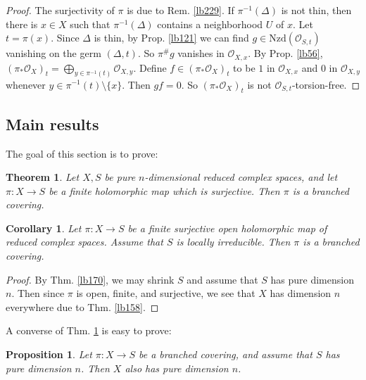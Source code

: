 \documentclass[12pt,b5paper,notitlepage]{report}
\theoremstyle{definition}
\theoremstyle{plain}
\newtheorem{thm}[df]{Theorem}
\newtheorem{pp}[df]{Proposition}
\newtheorem{co}[df]{Corollary}
\newcommand{\scr}{\mathscr}
\newcommand{\Nzd}{\mathrm{Nzd}}
\numberwithin{equation}{section}
\begin{document}
\begin{proof}
The surjectivity of $\pi$ is due to Rem. \ref{lb229}. If $\pi^{-1}(\Delta)$ is not thin, then there is $x\in X$ such that $\pi^{-1}(\Delta)$ contains a neighborhood $U$ of $x$. Let $t=\pi(x)$. Since $\Delta$ is thin, by Prop. \ref{lb121} we can find $g\in\Nzd(\scr O_{S,t})$ vanishing on the germ $(\Delta,t)$. So $\pi^\#g$ vanishes in $\scr O_{X,x}$. By Prop. \ref{lb56}, $(\pi_*\scr O_X)_t=\bigoplus_{y\in\pi^{-1}(t)}\scr O_{X,y}$. Define $f\in (\pi_*\scr O_X)_t$ to be $1$ in $\scr O_{X,x}$ and $0$ in $\scr O_{X,y}$ whenever $y\in\pi^{-1}(t)\setminus\{x\}$. Then $gf=0$. So $(\pi_*\scr O_X)_t$ is not $\scr O_{S,t}$-torsion-free.
\end{proof}



\subsection{Main results}


The goal of this section is to prove:


\begin{thm}\label{lb198}
Let $X,S$ be pure $n$-dimensional reduced complex spaces, and let $\pi:X\rightarrow S$ be a finite holomorphic map which is surjective. Then $\pi$ is a branched covering.
\end{thm}



\begin{co}\label{lb233}
Let $\pi:X\rightarrow S$ be a finite surjective open holomorphic map of reduced complex spaces. Assume that $S$ is locally irreducible. Then $\pi$ is a branched covering.
\end{co}


\begin{proof}
By Thm. \ref{lb170}, we may shrink $S$ and assume that $S$ has pure dimension $n$. Then since $\pi$ is open, finite, and surjective, we see that $X$ has dimension $n$ everywhere due to Thm. \ref{lb158}.
\end{proof}





A converse of Thm. \ref{lb198} is easy to prove:

\begin{pp}
Let $\pi:X\rightarrow S$ be a branched covering, and assume that $S$ has pure dimension $n$. Then $X$ also has pure dimension $n$.
\end{pp}
\end{document}
